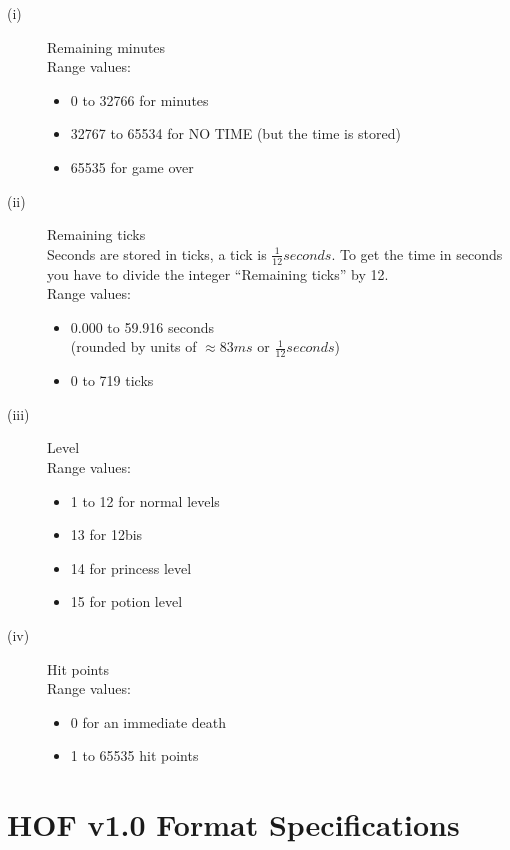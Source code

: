 \documentclass{article}
\begin{document}
\begin{description}
\item[(i)] Remaining minutes\\
  Range values:
  \begin{itemize}
   \item 0     to 32766 for minutes
   \item 32767 to 65534 for NO TIME (but the time is stored)
   \item 65535 for game over
  \end{itemize}

\item[(ii)] Remaining ticks \\
  Seconds are stored in ticks, a tick is $\frac{1}{12} seconds$. To get the time in
  seconds you have to divide the integer ``Remaining ticks'' by 12.\\

  Range values:
  \begin{itemize}
   \item 0.000 to 59.916 seconds \\
                   (rounded by units of $\approx 83 ms$ or $\frac{1}{12} seconds$)
   \item 0     to 719    ticks
  \end{itemize}

\item[(iii)] Level \\
  Range values:
  \begin{itemize}
   \item 1  to 12 for normal levels
   \item 13 for 12bis
   \item 14 for princess level
   \item 15 for potion level
  \end{itemize}

\item[(iv)] Hit points \\
  Range values:
  \begin{itemize}
   \item 0 for an immediate death
   \item 1 to 65535 hit points
  \end{itemize}
\end{description}

\section{HOF v1.0 Format Specifications}
\end{document}
